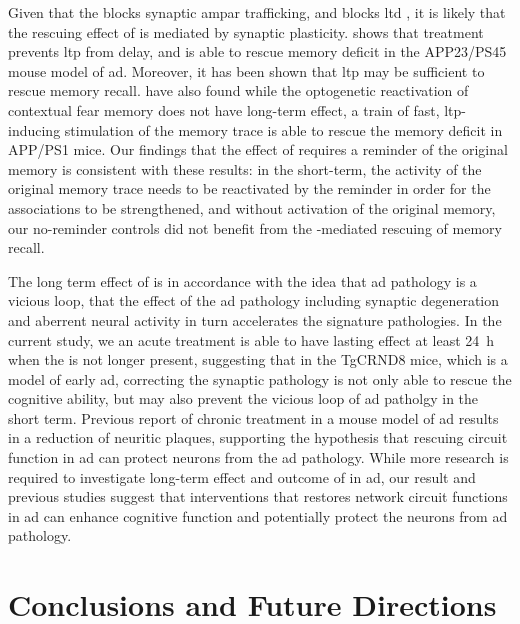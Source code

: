 Given that the \tglu blocks synaptic \gls{ampar} trafficking, and blocks \gls{ltd} , it is likely that the rescuing effect of \tglu is mediated by synaptic plasticity. \citet{dong15} shows that \tglu treatment prevents \gls{ltp} from delay, and is able to rescue memory deficit in the APP23/PS45 mouse model of \gls{ad}. Moreover, it has been shown that \gls{ltp} may be sufficient to rescue memory recall. \citet{roy16} have also found while the optogenetic reactivation of contextual fear memory does not have long-term effect, a train of fast, \gls{ltp}-inducing stimulation of the memory trace is able to rescue the memory deficit in APP/PS1 mice. Our findings that the effect of \tglu requires a reminder of the original memory is consistent with these results: in the short-term, the activity of the original memory trace needs to be reactivated by the reminder in order for the associations to be strengthened, and without activation of the original memory, our no-reminder controls did not benefit from the \tglu-mediated rescuing of memory recall.

The long term effect of \tglu is in accordance with the idea that \gls{ad} pathology is a vicious loop, that the effect of the \gls{ad} pathology including synaptic degeneration and aberrent neural activity in turn accelerates the signature pathologies. In the current study, we an acute \tglu treatment is able to have lasting effect at least \SI{24}{\hour} when the \tglu is not longer present, suggesting that in the TgCRND8 mice, which is a model of early \gls{ad}, correcting the synaptic pathology is not only able to rescue the cognitive ability, but may also prevent the vicious loop of \gls{ad} patholgy in the short term. Previous report of chronic \tglu treatment in a mouse model of \gls{ad} results in a reduction of neuritic plaques, supporting the hypothesis that rescuing circuit function in \gls{ad} can protect neurons from the \gls{ad} pathology. While more research is required to investigate long-term effect and outcome of \tglu in \gls{ad}, our result and previous studies \citep{roy16, migues16, dong15} suggest that interventions that restores network circuit functions in \gls{ad} can enhance cognitive function and potentially protect the neurons from \gls{ad} pathology. 



\chapter{Conclusions and Future Directions}

